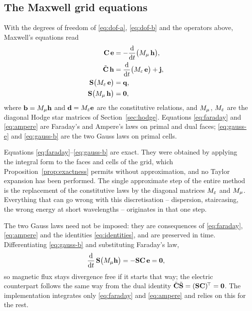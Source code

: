 \subsection{The Maxwell grid equations}

With the degrees of freedom of \eqref{eq:dof-a}, \eqref{eq:dof-b} and the operators above, Maxwell's equations
read
\begin{align}
  \mathbf{C}\,\mathbf{e} &= -\frac{\mathrm{d}}{\mathrm{d} t}\bigl({M_{\mu}}\,\mathbf{h}\bigr), \label{eq:faraday}\\
  \tilde{\mathbf{C}}\,\mathbf{h} &= \frac{\mathrm{d}}{\mathrm{d} t}\bigl({M_{\varepsilon}}\,\mathbf{e}\bigr) + \mathbf{j}, \label{eq:ampere}\\
  \mathbf{S}\bigl({M_{\varepsilon}}\,\mathbf{e}\bigr) &= \mathbf{q}, \label{eq:gauss-e}\\
  \mathbf{S}\bigl({M_{\mu}}\,\mathbf{h}\bigr) &= \mathbf{0}, \label{eq:gauss-b}
\end{align}
where $\mathbf{b} = {M_{\mu}}\mathbf{h}$ and $\mathbf{d} = {M_{\varepsilon}}\mathbf{e}$ are the constitutive relations, and ${M_{\mu}}$,
${M_{\varepsilon}}$ are the diagonal Hodge star matrices of Section~\ref{sec:hodge}. Equations \eqref{eq:faraday} and
\eqref{eq:ampere} are Faraday's and Ampere's laws on primal and dual faces; \eqref{eq:gauss-e} and
\eqref{eq:gauss-b} are the two Gauss laws on primal cells.

\begin{remark}
Equations \eqref{eq:faraday}--\eqref{eq:gauss-b} are exact. They were obtained by applying the integral form to
the faces and cells of the grid, which Proposition~\ref{prop:exactness} permits without approximation, and no Taylor expansion has
been performed. The single approximate step of the entire method is the replacement of the constitutive laws by
the diagonal matrices ${M_{\varepsilon}}$ and ${M_{\mu}}$. Everything that can go wrong with this discretisation -- dispersion,
staircasing, the wrong energy at short wavelengths -- originates in that one step.
\end{remark}

The two Gauss laws need not be imposed: they are consequences of \eqref{eq:faraday}, \eqref{eq:ampere} and the
identities \eqref{eq:identities}, and are preserved in time. Differentiating \eqref{eq:gauss-b} and substituting
Faraday's law,
\begin{equation}
  \frac{\mathrm{d}}{\mathrm{d} t}\,\mathbf{S}\bigl({M_{\mu}}\mathbf{h}\bigr) = -\mathbf{S}\mathbf{C}\,\mathbf{e} = \mathbf{0},
  \label{eq:gauss-preserved}
\end{equation}
so magnetic flux stays divergence free if it starts that way; the electric counterpart follows the same way from
the dual identity $\tilde{\mathbf{C}}\tilde{\mathbf{S}} = (\mathbf{S}\mathbf{C})^{\!\top} = \mathbf{0}$. The implementation integrates only
\eqref{eq:faraday} and \eqref{eq:ampere} and relies on this for the rest.

